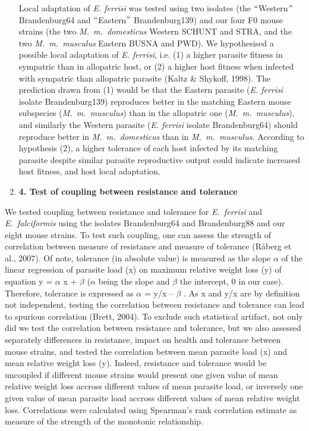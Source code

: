 \documentclass[12pt]{article}
\renewcommand{\_}{\kern-1.5pt\textunderscore\kern-1.5pt}
\begin{document}
\begin{enumerate}
\textcolor[HTML]{FF0000}{Local adaptation of \textit{E. ferrisi} was tested using two isolates (the $``$Western$"$  Brandenburg64 and $``$Eastern$"$  Brandenburg139) and our four F0 mouse strains (the two \textit{M. m. domesticus} Western SCHUNT and STRA, and the two \textit{M. m. musculus }Eastern BUSNA and PWD). We hypothesised a possible local adaptation of \textit{E. ferrisi}}, i.e. (1) a higher parasite fitness in sympatric than in allopatric host, or (2) a higher host fitness when infected with sympatric than allopatric parasite (Kaltz $\&$  Shykoff, 1998). The prediction drawn from (1) would be that the Eastern parasite (\textit{E. ferrisi} isolate Brandenburg139) reproduces better in the matching Eastern mouse subspecies (\textit{M. m. musculus}) than in the allopatric one (\textit{M. m. musculus}), and similarly the Western parasite (\textit{E. ferrisi} isolate Brandenburg64) should reproduce better in \textit{M. m. domesticus} than in \textit{M. m. musculus.}\textcolor[HTML]{CE181E}{ According to hypothesis (2), a higher tolerance of each host infected by its matching parasite despite similar parasite reproductive output could indicate increased host fitness, and host local adaptation.}\par

	\item \textbf{\textcolor[HTML]{FF0000}{4. Test of coupling between resistance and tolerance}}
\end{enumerate}\par

\textcolor[HTML]{FF0000}{We tested coupling between resistance and tolerance for \textit{E. ferrisi} and \textit{E. falciformis }using the isolates Brandenburg64 and Brandenburg88 and our eight mouse strains. To test such coupling, one can assess the strength of correlation between measure of resistance and measure of tolerance (Råberg et al., 2007). Of note, tolerance (in absolute value) is measured as the slope $ \alpha $  of the linear regression of parasite load (x) on maximum relative weight loss (y) of equation y = $ \alpha $ x + $ \beta $  ($ \alpha $  being the slope and $ \beta $  the intercept, 0 in our case). Therefore, tolerance is expressed as $ \alpha $  = y/x – $ \beta $ . As x and y/x are by definition not independent, testing the correlation between resistance and tolerance can lead to spurious correlation (Brett, 2004). To exclude such statistical artifact, not only did we test the correlation between resistance and tolerance, but we also assessed separately differences in resistance, impact on health and tolerance between mouse strains, and tested the correlation between mean parasite load (x) and mean relative weight loss (y). Indeed, resistance and tolerance would be uncoupled if different mouse strains would present one given value of mean relative weight loss accross different values of mean parasite load, or inversely one given value of mean parasite load accross different values of mean relative weight loss. Correlations were calculated using Spearman’s rank correlation estimate as measure of the strength of the monotonic relationship.}\par
\end{document}
